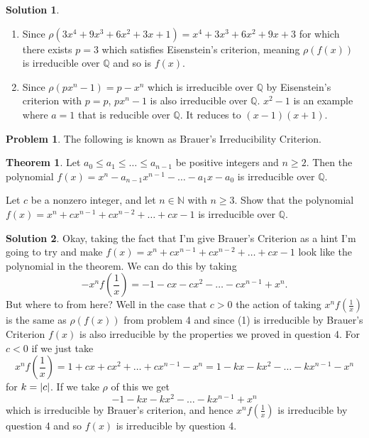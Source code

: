 \documentclass[10pt]{article}
\theoremstyle{definition}
\newtheorem{problem}{Problem}
\newtheorem{soln}{Solution}
\newtheorem{theorem}{Theorem}
\begin{document}
\begin{soln}
\begin{enumerate}[label=(\alph*)]
          we've verified the result for this case.
    \item Since $\rho(3x^4 + 9x^3 + 6x^2 + 3x + 1)=x^4 + 3x^3 + 6x^2 + 9x + 3$ for which there exists $p=3$ which satisfies Eisenstein's criterion, meaning $\rho(f(x))$
          is irreducible over $\mathbb{Q}$ and so is $f(x)$.
    \item Since $\rho(px^n -1)=p-x^n$ which is irreducible over $\mathbb{Q}$ by Eisenstein's criterion with $p=p$, $px^n -1$ is also irreducible over $\mathbb{Q}$.
          $x^2-1$ is an example where $a=1$ that is reducible over $\mathbb{Q}$. It reduces to $(x-1)(x+1)$.
  \end{enumerate}
\end{soln}

\begin{problem}
The following is known as Brauer's Irreducibility Criterion.
\begin{theorem}
  Let $a_0\leq a_1\leq\dots\leq a_{n-1}$ be positive integers and $n\geq 2$. Then the polynomial $f(x)=x^n-a_{n-1}x^{n-1}-\dots-a_1x-a_0$ is irreducible over $\mathbb{Q}$.
\end{theorem}
Let $c$ be a nonzero integer, and let $n\in\mathbb{N}$ with $n \geq 3$. Show that
the polynomial $f(x)=x^n+cx^{n-1}+cx^{n-2}+\dots+cx-1$ is irreducible
over $\mathbb{Q}$.
\end{problem}
\begin{soln}
  Okay, taking the fact that I'm give Brauer's Criterion as a hint I'm going to try and make $f(x)=x^n+cx^{n-1}+cx^{n-2}+\dots+cx-1$ look like the polynomial in the theorem.
  We can do this by taking \begin{equation}
    -x^nf(\frac{1}{x})=-1-cx-cx^{2}-\dots-cx^{n-1}+x^n.
  \end{equation}
  But where to from here? Well in the case that $c>0$ the action of taking $x^nf(\frac{1}{x})$ is the same as $\rho(f(x))$ from problem 4 and since (1) is irreducible by
  Brauer's Criterion $f(x)$ is also irreducible by the properties we proved in question 4. For $c<0$ if we just take
  \begin{equation}
    x^nf(\frac{1}{x})=1+cx+cx^{2}+\dots+cx^{n-1}-x^n=1-kx-kx^{2}-\dots-kx^{n-1}-x^n
  \end{equation}
  for $k=\abs{c}$. If we take $\rho$ of this we get
  $$-1-kx-kx^{2}-\dots-kx^{n-1}+x^n$$
  which is irreducible by Brauer's criterion, and hence $x^nf(\frac{1}{x})$ is irreducible by question 4 and so $f(x)$ is irreducible by question 4.
\end{soln}
\end{document}
